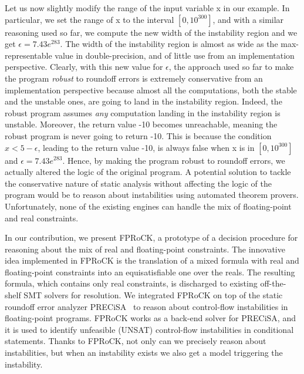 Let us now slightly modify the range of the input variable x in our example. 
%
In particular, we set the range of x to the interval $[0, 10^{300}]$, and with a similar reasoning used so far, we compute the new width of the instability region and we get $\epsilon=7.43e^{283}$.
%
The width of the instability region is almost as wide as the max-representable value in double-precision, and of little use from an implementation perspective. 
%
Clearly, with this new value for $\epsilon$, the approach used so far to make the program \emph{robust} to roundoff errors is extremely conservative from an implementation perspective because almost all the computations, both the stable and the unstable ones, are going to land in the instability region.
%
Indeed, the robust program assumes \emph{any} computation landing in the instability region is unstable.
%
Moreover, the return value -10 becomes unreachable, meaning the robust program is never going to return -10.
%
%
This is because the condition $x<5-\epsilon$, leading to the return value -10, is always false when x is in $[0, 10^{300}]$ and $\epsilon=7.43e^{283}$.
%
Hence, by making the program robust to roundoff errors, we actually altered the logic of the original program.
%
A potential solution to tackle the conservative nature of static analysis without affecting the logic of the program would be to reason about instabilities using automated theorem provers.
%
Unfortunately, none of the existing engines can handle the mix of floating-point and real constraints.
%

%
In our contribution, we present FPRoCK, a prototype of a decision procedure for reasoning about the mix of real and floating-point constraints.
%
The innovative idea implemented in FPRoCK is the translation of a mixed formula with real and floating-point constraints into an equisatisfiable one over the reals.
%
The resulting formula, which contains only real constraints, is discharged to existing off-the-shelf SMT solvers for resolution.
%
We integrated FPRoCK on top of the static roundoff error analyzer PRECiSA~\cite{precisa} to reason about control-flow instabilities in floating-point programs.
%
FPRoCK works as a back-end solver for PRECiSA, and it is used to identify unfeasible (UNSAT) control-flow instabilities in conditional statements.
%
Thanks to FPRoCK, not only can we precisely reason about instabilities, but when an instability exists we also get a model triggering the instability.

